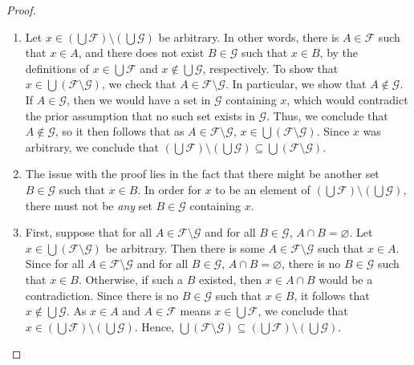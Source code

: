 \documentclass[12pt]{amsart}
\theoremstyle{definition}
\theoremstyle{remark}
\begin{document}
\begin{proof}
\hfill
\begin{enumerate}
	\item Let $x \in \left( \bigcup \mathcal{F} \right) \setminus \left( \bigcup \mathcal{G} \right)$
	be arbitrary.
	In other words, there is $A \in \mathcal{F}$ such that $x \in A$,
	and there does not exist $B \in \mathcal{G}$ such that $x \in B$, by the definitions of
	$x  \in \bigcup \mathcal{F}$ and $x \notin \bigcup \mathcal{G}$, respectively.
	To show that $x \in \bigcup (\mathcal{F} \setminus \mathcal{G})$, we check that
	$A \in \mathcal{F} \setminus \mathcal{G}$.
	In particular, we show that $A \notin \mathcal{G}$.
	If $A \in \mathcal{G}$, then we would have a set in $\mathcal{G}$ containing $x$,
	which would contradict the prior assumption that no such set exists in $\mathcal{G}$.
	Thus, we conclude that $A \notin \mathcal{G}$, so it then follows that as
	$A \in \mathcal{F} \setminus \mathcal{G}$, $x \in \bigcup (\mathcal{F} \setminus \mathcal{G})$.
	Since $x$ was arbitrary, we conclude that
	$\left( \bigcup \mathcal{F} \right) \setminus \left( \bigcup \mathcal{G} \right)
	\subseteq \bigcup (\mathcal{F} \setminus \mathcal{G})$.
	
	\item The issue with the proof lies in the fact that there might be another set $B \in \mathcal{G}$
	such that $x \in B$.
	In order for $x$ to be an element of 
	$\left( \bigcup \mathcal{F} \right) \setminus \left( \bigcup \mathcal{G} \right)$,
	there must not be \emph{any} set $B \in \mathcal{G}$ containing $x$.
	
	\item First, suppose that for all $A \in \mathcal{F} \setminus \mathcal{G}$
	and for all $B \in \mathcal{G}$, $A \cap B = \varnothing$.
	Let $x \in \bigcup \left( \mathcal{F} \setminus \mathcal{G} \right)$ be arbitrary.
	Then there is some $A \in \mathcal{F} \setminus \mathcal{G}$ such that $x \in A$.
	Since for all $A \in \mathcal{F} \setminus \mathcal{G}$ and for all $B \in \mathcal{G}$,
	$A \cap B = \varnothing$, there is no $B \in \mathcal{G}$ such that $x \in B$.
	Otherwise, if such a $B$ existed, then $x \in A \cap B$ would be a contradiction.
	Since there is no $B \in \mathcal{G}$ such that $x \in B$, it follows that
	$x \notin \bigcup \mathcal{G}$.
	As $x \in A$ and $A \in \mathcal{F}$ means $x \in \bigcup \mathcal{F}$,
	we conclude that 
	$x \in \left( \bigcup \mathcal{F} \right) \setminus \left( \bigcup \mathcal{G} \right)$.
	Hence, $\bigcup (\mathcal{F} \setminus \mathcal{G})
	\subseteq \left( \bigcup \mathcal{F} \right) \setminus \left( \bigcup \mathcal{G} \right)$.
	

\end{enumerate}
\end{proof}
\end{document}
